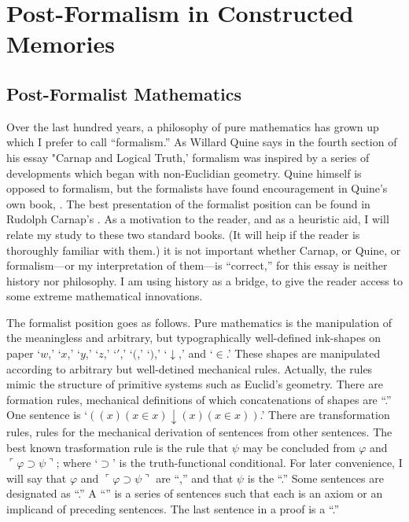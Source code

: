 \newcommand{\midheading}[1]{
	{ \vskip 1em \centering \large \textsc{#1} \par \vskip 1em }}


\chapter{Post-Formalism in Constructed Memories}
\section{Post-Formalist Mathematics}

Over the last hundred years, a philosophy of pure mathematics has 
grown up which I prefer to call \enquote{formalism.} As Willard Quine says in the 
fourth section of his essay "Carnap and Logical Truth,' formalism was 
inspired by a series of developments which began with non-Euclidian 
geometry. Quine himself is opposed to formalism, but the formalists have 
found encouragement in Quine's own book, . The best 
presentation of the formalist position can be found in Rudolph Carnap's 
. As a motivation to the reader, and 
as a heuristic aid, I will relate my study to these two standard books. (It will 
heip if the reader is thoroughly familiar with them.) it is not important 
whether Carnap, or Quine, or formalism---or my interpretation of them---is 
\enquote{correct,} for this essay is neither history nor philosophy. I am using history 
as a bridge, to give the reader access to some extreme mathematical 
innovations. 

The formalist position goes as follows. Pure mathematics is the 
manipulation of the meaningless and arbitrary, but typographically 
well-defined ink-shapes on paper `$w$,' `$x$,' `$y$,' `$z$,' `$'$,' `$($,' `$)$,' `$\downarrow$,' and `$\in$.' 
These shapes are manipulated according to arbitrary but well-detined 
mechanical rules. Actually, the rules mimic the structure of primitive 
systems such as Euclid's geometry. There are formation rules, mechanical 
definitions of which concatenations of shapes are \enquote{.} One sentence 
is `$((x) (x\in x) \downarrow (x) (x\in x))$.' There are transformation rules, rules for the 
mechanical derivation of sentences from other sentences. The best known 
trasformation rule is the rule that $\psi$ may be concluded from $\varphi$ and 
$\ulcorner \varphi \supset \psi \urcorner$; 
where `$\supset$' is the truth-functional conditional. For later convenience, I will 
say that $\varphi$ and $\ulcorner \varphi \supset \psi \urcorner$ are \enquote{,} 
and that $\psi$ is the \enquote{.} 
Some sentences are designated as \enquote{.} A \enquote{} is a series of 
sentences such that each is an axiom or an implicand of preceding sentences. 
The last sentence in a proof is a \enquote{.} 

